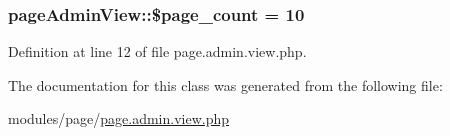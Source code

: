 \hypertarget{classpageAdminView_a326ed8f2249c47efa48b3fe781e11fa4}{
\subsubsection[{\$page\-\_\-count}]{\setlength{\rightskip}{0pt plus 5cm}page\-Admin\-View\-::\$page\-\_\-count = 10}}\label{classpageAdminView_a326ed8f2249c47efa48b3fe781e11fa4}


Definition at line 12 of file page.\-admin.\-view.\-php.



The documentation for this class was generated from the following file\-:\begin{DoxyCompactItemize}
\item 
modules/page/\hyperlink{page_8admin_8view_8php}{page.\-admin.\-view.\-php}\end{DoxyCompactItemize}
